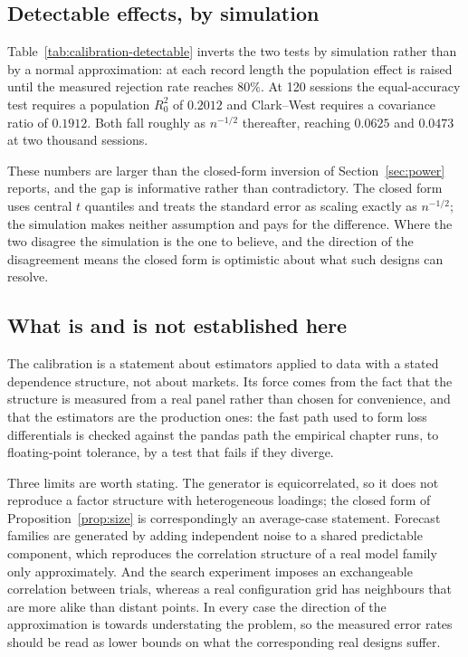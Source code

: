 \documentclass{article}
\theoremstyle{plain}
\theoremstyle{remark}
\begin{document}
\subsection{Detectable effects, by simulation}

Table~\ref{tab:calibration-detectable} inverts the two tests by simulation
rather than by a normal approximation: at each record length the population
effect is raised until the measured rejection rate reaches $80\%$. At 120
sessions the equal-accuracy test requires a population $R^2_0$ of $0.2012$ and
Clark--West requires a covariance ratio of $0.1912$. Both fall roughly as
$n^{-1/2}$ thereafter, reaching $0.0625$ and $0.0473$ at two thousand sessions.

These numbers are larger than the closed-form inversion of
Section~\ref{sec:power} reports, and the gap is informative rather than
contradictory. The closed form uses central $t$ quantiles and treats the
standard error as scaling exactly as $n^{-1/2}$; the simulation makes neither
assumption and pays for the difference. Where the two disagree the simulation is
the one to believe, and the direction of the disagreement means the closed form
is optimistic about what such designs can resolve.



\subsection{What is and is not established here}

The calibration is a statement about estimators applied to data with a stated
dependence structure, not about markets. Its force comes from the fact that the
structure is measured from a real panel rather than chosen for convenience, and
that the estimators are the production ones: the fast path used to form loss
differentials is checked against the pandas path the empirical chapter runs, to
floating-point tolerance, by a test that fails if they diverge.

Three limits are worth stating. The generator is equicorrelated, so it does not
reproduce a factor structure with heterogeneous loadings; the closed form of
Proposition~\ref{prop:size} is correspondingly an average-case statement.
Forecast families are generated by adding independent noise to a shared
predictable component, which reproduces the correlation structure of a real
model family only approximately. And the search experiment imposes an exchangeable
correlation between trials, whereas a real configuration grid has neighbours
that are more alike than distant points. In every case the direction of the
approximation is towards understating the problem, so the measured error rates
should be read as lower bounds on what the corresponding real designs suffer.
\end{document}
